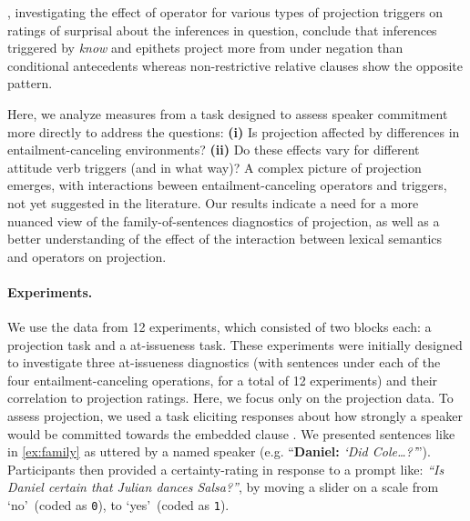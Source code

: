 	\cite{smith_relationship_2014}, investigating the effect of operator for various types of projection triggers on ratings of surprisal about the inferences in question, conclude that inferences triggered by \emph{know} and epithets project more from under negation than conditional antecedents whereas non-restrictive relative clauses show the opposite pattern.

	Here, we analyze measures from a task designed to assess speaker commitment more directly to address the questions: \textbf{(i)} Is projection affected by differences in entailment-canceling environments? \textbf{(ii)} Do these effects vary for different attitude verb triggers (and in what way)? A complex picture of projection emerges, with interactions beween entailment-canceling operators and triggers, not yet suggested in the literature. Our results indicate a need for a more nuanced view of the family-of-sentences diagnostics of projection, as well as a better understanding of the effect of the interaction between lexical semantics and operators on projection.

\vspace{-\baselineskip}
\paragraph{Experiments.} \hspace{-1em}
	We use the data from 12 experiments, which consisted of two blocks each: a projection task and a at-issueness task. These experiments were initially designed to investigate three at-issueness diagnostics (with sentences under each of the four entailment-canceling operations, for a total of 12 experiments) and their correlation to projection ratings. Here, we focus only on the projection data. To assess projection, we used a task eliciting responses about how strongly a speaker would be committed towards the embedded clause \citep[from][]{tonhauser_prosodic_2016}. We presented sentences like in \ref{ex:family} as uttered by a named speaker (e.g. “\textbf{Daniel:} \emph{\lq Did Cole\dots?\rq}”). Participants then provided a certainty-rating in response to a prompt like: \emph{“Is Daniel certain that Julian dances Salsa?”}, by moving a slider on a scale from \lq no\rq\ (coded as \texttt{0}), to \lq yes\rq\ (coded as \texttt{1}). 


\vspace{-\baselineskip}
